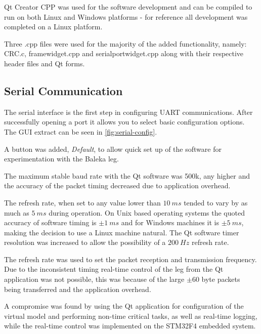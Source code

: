 Qt Creator CPP was used for the software development and can be compiled to run on both Linux and Windows platforms - for reference all development was completed on a Linux platform.

Three .cpp files were used for the majority of the added functionality, namely: CRC.c, framewidget.cpp and serialportwidget.cpp along with their respective header files and Qt forms.

\subsection{Serial Communication}
\label{sec:Serial Communication}

The serial interface is the first step in configuring UART communications. After successfully opening a port it allows you to select basic configuration options. The GUI extract can be seen in \cref{fig:serial-config}\cite{jorgeaparicio2013}.

A button was added, \textit{Default}, to allow quick set up of the software for experimentation with the Baleka leg. 

The maximum stable baud rate with the Qt software was 500k, any higher and the accuracy of the packet timing decreased due to application overhead. 

The refresh rate, when set to any value lower than $10\ ms$ tended to vary by as much as $5\ ms$ during operation. On Unix based operating systems the quoted accuracy of software timing is $\pm 1\ ms$ and for Windows machines it is $\pm 5\ ms$, making the decision to use a Linux machine natural. The Qt software timer resolution was increased to allow the possibility of a $200\ Hz$ refresh rate. 

The refresh rate was used to set the packet reception and transmission frequency. Due to the inconsistent timing real-time control of the leg from the Qt application was not possible, this was because of the large $\pm 60$ byte packets being transferred and the application overhead.

A compromise was found by using the Qt application for configuration of the virtual model and performing non-time critical tasks, as well as real-time logging, while the real-time control was implemented on the STM32F4 embedded system.

